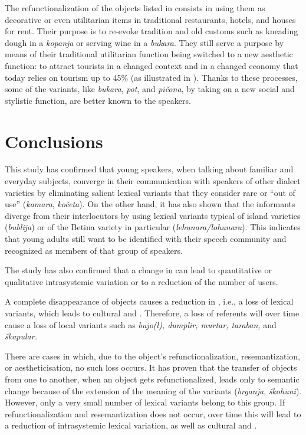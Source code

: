 \documentclass[output=paper]{LSP/langsci}
\begin{document}
The refunctionalization of the objects listed in  consists in using them as decorative or even utilitarian items in traditional restaurants, hotels, and houses for rent. Their purpose is to re-evoke tradition and old customs such as kneading dough in a \textit{kopanja} or serving wine in a \textit{bukara}. They still serve a purpose by means of their traditional utilitarian function being switched to a new aesthetic function: to attract tourists in a changed context and in a changed economy that today relies on tourism up to 45\% (as illustrated in ). Thanks to these processes, some of the variants, like \textit{bukara}, \textit{pot}, and \textit{pičona}, by taking on a new social and stylistic function, are better known to the speakers. 

\section{Conclusions}
This study has confirmed that young speakers, when talking about familiar and everyday subjects, converge in their communication with speakers of other dialect varieties by eliminating salient lexical variants that they consider rare or “out of use” (\textit{kamara}, \textit{kočeta}). On the other hand, it has also shown that the informants diverge from their interlocutors by using lexical variants typical of island varieties (\textit{bublija}) or of the Betina variety in particular (\textit{lehunara/lohunara}). This indicates that young adults still want to be identified with their speech community and recognized as members of that group of speakers. 

The study has also confirmed that a change in  can lead to quantitative or qualitative intrasystemic variation or to a reduction of the number of users. 

A complete disappearance of objects causes a reduction in , i.e., a loss of lexical variants, which leads to cultural and . Therefore, a loss of referents will over time cause a loss of local variants such as \textit{bujo(l), dumplir, murtar, taraban, }and \textit{škapular. }

There are cases in which, due to the object’s refunctionalization, resemantization, or aestheticisation, no such loss occurs. It has proven that the transfer of objects from one  to another, when an object gets refunctionalized, leads only to semantic change because of the extension of the meaning of the variants (\textit{brganja}, \textit{škohuni}). However, only a very small number of lexical variants belong to this group. If refunctionalization and resemantization does not occur, over time this will lead to a reduction of intrasystemic lexical variation, as well as cultural and . 
\end{document}
